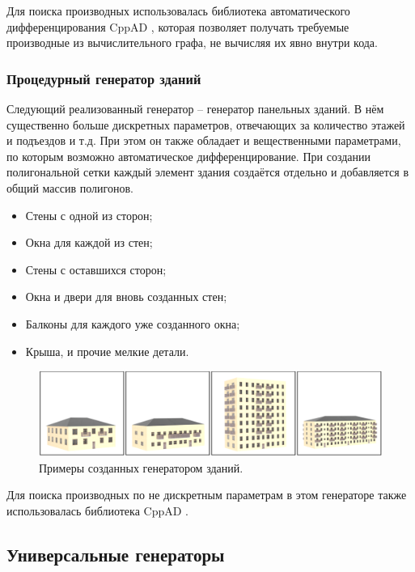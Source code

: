 \documentclass[a4paper,hidelinks,12pt]{article}
\begin{document}
\par
Для поиска производных использовалась библиотека автоматического дифференцирования CppAD \cite{bell2012cppad}, которая позволяет получать требуемые производные из вычислительного графа, не вычисляя их явно внутри кода. 
\subsubsection{Процедурный генератор зданий}
Следующий реализованный генератор – генератор панельных зданий. В нём существенно больше дискретных параметров, отвечающих за количество этажей и подъездов и т.д. При этом он также обладает и вещественными параметрами, по которым возможно автоматическое дифференцирование. При создании полигональной сетки каждый элемент здания создаётся отдельно и добавляется в общий массив полигонов.
\begin{itemize}
    \item Стены с одной из сторон;
    \item Окна для каждой из стен;
    \item Стены с оставшихся сторон;
    \item Окна и двери для вновь созданных стен;
    \item Балконы для каждого уже созданного окна;
    \item Крыша, и прочие мелкие детали.
\end{itemize}

\begin{figure}[H]
\begin{center}
	\includegraphics[width=15 cm]{houses_gen.png}
	\caption{Примеры созданных генератором зданий.}
 	\label{fig_house}
\end{center}
\end{figure}

\par
Для поиска производных по не дискретным параметрам в этом генераторе также использовалась библиотека CppAD \cite{bell2012cppad}.

\subsection{Универсальные генераторы}
\end{document}
